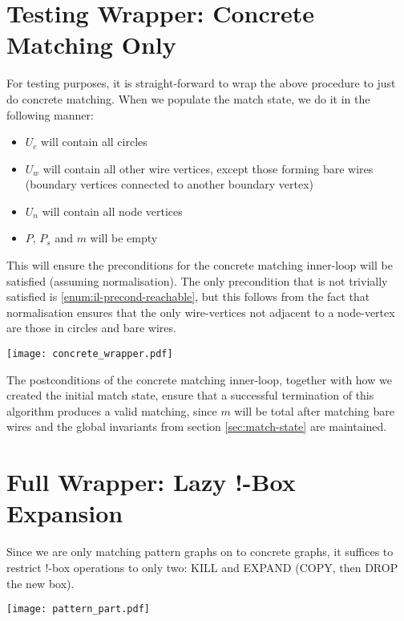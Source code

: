 \documentclass{article}
\begin{document}
\section{Testing Wrapper: Concrete Matching Only}
\label{sec:test-wrapper}

For testing purposes, it is straight-forward to wrap the above procedure to just do concrete matching.  When we populate the match state, we do it in the following manner:
\begin{itemize}
\item $U_c$ will contain all circles
\item $U_w$ will contain all other wire vertices, except those forming bare wires (boundary vertices connected to another boundary vertex)
\item $U_n$ will contain all node vertices
\item $P$, $P_s$ and $m$ will be empty
\end{itemize}

This will ensure the preconditions for the concrete matching inner-loop will be satisfied (assuming normalisation).  The only precondition that is not trivially satisfied is \ref{enum:il-precond-reachable}, but this follows from the fact that normalisation ensures that the only wire-vertices not adjacent to a node-vertex are those in circles and bare wires.

\begin{center}
  \texttt{[image: concrete\_wrapper.pdf]}
\end{center}

The postconditions of the concrete matching inner-loop, together with how we created the initial match state, ensure that a successful termination of this algorithm produces a valid matching, since $m$ will be total after matching bare wires and the global invariants from section \ref{sec:match-state} are maintained.

\section{Full Wrapper: Lazy !-Box Expansion}
\label{sec:full-wrapper}

Since we are only matching pattern graphs on to concrete graphs, it suffices to restrict $!$-box operations to only two: KILL and EXPAND (COPY, then DROP the new box).

\begin{center}
  \texttt{[image: pattern\_part.pdf]}
\end{center}
\end{document}
